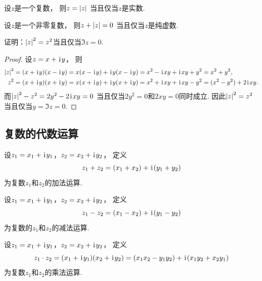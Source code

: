 \begin{property}
设\(z\)是一个复数，
则\(z = \abs{z}\)
当且仅当\(z\)是实数.
\end{property}

\begin{property}
设\(z\)是一个非零复数，
则\(z + \abs{z} = 0\)
当且仅当\(z\)是纯虚数.
\end{property}

\begin{example}
证明：\(\abs{z}^2 = z^2\)当且仅当\(\Im z = 0\).
\begin{proof}
设\(z = x + \kern1pt\mathrm{i}\kern1pt y\)，
则\begin{align*}
	\abs{z}^2
	&= (x + \kern1pt\mathrm{i}\kern1pt y) (x - \kern1pt\mathrm{i}\kern1pt y)
	= x (x - \kern1pt\mathrm{i}\kern1pt y) + \kern1pt\mathrm{i}\kern1pt y (x - \kern1pt\mathrm{i}\kern1pt y)
	= x^2 - \kern1pt\mathrm{i}\kern1pt x y + \kern1pt\mathrm{i}\kern1pt x y + y^2
	= x^2 + y^2, \\
	z^2
	&= (x + \kern1pt\mathrm{i}\kern1pt y) (x + \kern1pt\mathrm{i}\kern1pt y)
	= x (x + \kern1pt\mathrm{i}\kern1pt y) + \kern1pt\mathrm{i}\kern1pt y (x + \kern1pt\mathrm{i}\kern1pt y)
	= x^2 + \kern1pt\mathrm{i}\kern1pt x y + \kern1pt\mathrm{i}\kern1pt x y - y^2
	= (x^2 - y^2) + 2 \kern1pt\mathrm{i}\kern1pt x y.
\end{align*}
而\(\abs{z}^2 - z^2 = 2 y^2 - 2 \kern1pt\mathrm{i}\kern1pt x y = 0\)
当且仅当\(2 y^2 = 0\)和\(2 x y = 0\)同时成立.
因此\(\abs{z}^2 = z^2\)
当且仅当\(y = \Im z = 0\).
\end{proof}
\end{example}

\subsection{复数的代数运算}
\begin{definition}%
设\(z_1=x_1+\kern1pt\mathrm{i}\kern1pt y_1\)，\(z_2=x_2+\kern1pt\mathrm{i}\kern1pt y_2\)，
定义\begin{equation*}
	z_1+z_2=(x_1+x_2)+\kern1pt\mathrm{i}\kern1pt(y_1+y_2)
\end{equation*}为复数\(z_1\)和\(z_2\)的加法运算.
\end{definition}

\begin{definition}%
设\(z_1=x_1+\kern1pt\mathrm{i}\kern1pt y_1\)，\(z_2=x_2+\kern1pt\mathrm{i}\kern1pt y_2\)，
定义\begin{equation*}
	z_1-z_2=(x_1-x_2)+\kern1pt\mathrm{i}\kern1pt(y_1-y_2)
\end{equation*}为复数的\(z_1\)和\(z_2\)的减法运算.
\end{definition}

\begin{definition}%
设\(z_1 = x_1 + \kern1pt\mathrm{i}\kern1pt y_1\)，\(z_2 = x_2 + \kern1pt\mathrm{i}\kern1pt y_2\)，
定义\begin{equation*}
	z_1 \cdot z_2
	= (x_1 + \kern1pt\mathrm{i}\kern1pt y_1)(x_2 + \kern1pt\mathrm{i}\kern1pt y_2)
	= (x_1 x_2 - y_1 y_2)+\kern1pt\mathrm{i}\kern1pt(x_1 y_2 + x_2 y_1)
\end{equation*}为复数\(z_1\)和\(z_2\)的乘法运算.
\end{definition}

